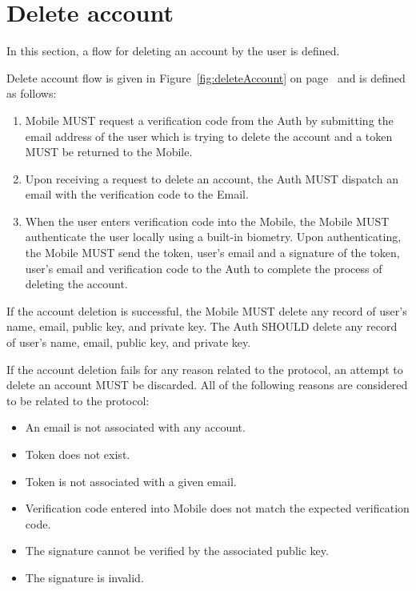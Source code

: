 \section{Delete account}
In this section, a flow for deleting an account by the user is defined. 
\medskip

Delete account flow is given in Figure~\ref{fig:deleteAccount} on page~\pageref{fig:deleteAccount} and is defined 
as follows:
    \begin{enumerate}
        \item Mobile MUST request a verification code from the Auth by submitting the email address of the user
              which is trying to delete the account and a token MUST be returned to the Mobile.
        \item Upon receiving a request to delete an account, the Auth MUST dispatch an email with the verification
              code to the Email.
        \item When the user enters verification code into the Mobile, the Mobile MUST authenticate the user locally 
              using a built-in biometry. Upon authenticating, the Mobile MUST send the token, user's email and a 
              signature of the token, user's email and verification code to the Auth to complete the process of 
              deleting the account.
    \end{enumerate}
    
If the account deletion is successful, the Mobile MUST delete any record of user's name, email, public key, and 
private key. The Auth SHOULD delete any record of user's name, email, public key, and private key.
\medskip

If the account deletion fails for any reason related to the protocol, an attempt to delete an account MUST be 
discarded. All of the following reasons are considered to be related to the protocol:
    \begin{itemize}
        \item An email is not associated with any account.
        \item Token does not exist.
        \item Token is not associated with a given email.
        \item Verification code entered into Mobile does not match the expected verification code.
        \item The signature cannot be verified by the associated public key.
        \item The signature is invalid.
    \end{itemize}
